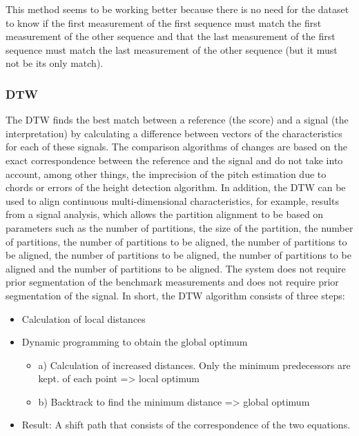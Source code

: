 \documentclass{article}
\begin{document}
This method seems to be working better because there is no need for the dataset to know if the first measurement of the first sequence must match the first measurement of the other sequence and that the last measurement of the first sequence must match the last measurement of the other sequence (but it must not be its only match).


\subsubsection{DTW}

 The DTW finds the best match between a reference (the score) and a signal (the interpretation) by calculating a difference between vectors of the characteristics for each of these signals. The comparison algorithms of changes are based on the exact correspondence between the reference and the signal and do not take into account, among other things, the imprecision of the pitch estimation due to chords or errors of the height detection algorithm. In addition, the DTW can be used to align continuous multi-dimensional characteristics, for example, results from a signal analysis, which allows the partition alignment to be based on parameters such as the number of partitions, the size of the partition, the number of partitions, the number of partitions to be aligned, the number of partitions to be aligned, the number of partitions to be aligned, the number of partitions to be aligned and the number of partitions to be aligned.
The system does not require prior segmentation of the benchmark measurements and does not require prior segmentation of the
signal.
In short, the DTW algorithm consists of three steps:

\begin{itemize}
    \item Calculation of local distances
    \item Dynamic programming to obtain the global optimum \begin{itemize}
        \item a) Calculation of increased distances. Only the minimum predecessors are kept. of each point => local optimum
        \item b) Backtrack to find the minimum distance => global optimum
    \end{itemize}
    \item Result: A shift path that consists of the correspondence of the two equations.
\end{itemize}
\end{document}
